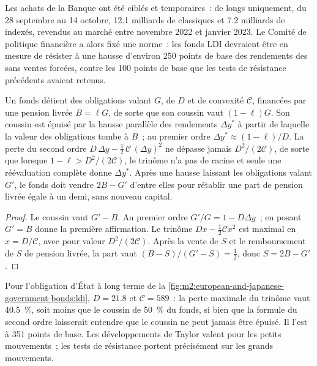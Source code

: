 Les achats de la Banque ont été ciblés et temporaires~: de longs  uniquement, du 28
septembre au 14 octobre, 12.1 milliards de  classiques et 7.2 milliards de 
indexés, revendus au marché entre novembre 2022 et janvier
2023. Le Comité de politique financière a alors fixé une norme~: les fonds LDI devraient
être en mesure de résister à une hausse d'environ 250 points de base des rendements des  sans
ventes forcées, contre les 100 points de base que les tests de résistance précédents
avaient retenus.

\begin{proposition}\label{prop:m2:european-and-japanese-government-bonds:cushion}
Un fonds détient des obligations valant $G$, de  $D$ et de convexité $\mathcal C$,
financées par une pension livrée $B = \ell G$, de sorte que son coussin vaut $(1-\ell)G$. Son coussin est
épuisé par la hausse parallèle des rendements $\Delta y^*$ à partir de laquelle la valeur des obligations tombe
à $B$~; au premier ordre $\Delta y^* \approx (1-\ell)/D$. La perte du second ordre
$D\,\Delta y - \frac12\,\mathcal C\,(\Delta y)^2$ ne dépasse jamais $D^2/(2\mathcal C)$, de sorte que
lorsque $1 - \ell > D^2/(2\mathcal C)$, le trinôme n'a pas de racine et seule une réévaluation complète
donne $\Delta y^*$. Après une hausse laissant les obligations valant $G'$, le
fonds doit vendre $2B - G'$ d'entre elles pour rétablir une part de pension livrée égale à un demi, sans
nouveau capital.
\end{proposition}
\begin{proof}
Le coussin vaut $G' - B$. Au premier ordre $G'/G = 1 - D\Delta y$~; en posant $G' = B$
donne la première affirmation. Le trinôme $D x - \frac12 \mathcal C x^2$ est maximal en
$x = D/\mathcal C$, avec pour valeur $D^2/(2\mathcal C)$. Après la vente de $S$ et le remboursement
de $S$ de pension livrée, la part vaut $(B - S)/(G' - S) = \frac12$, donc $S = 2B - G'$.
\end{proof}

Pour l'obligation d'État à long terme de la \cref{fig:m2:european-and-japanese-government-bonds:ldi},
$D = 21.8$ et $\mathcal C = 589$~: la perte maximale du trinôme vaut 40.5~\%, soit moins
que le coussin de 50~\% du fonds, si bien que la formule du second ordre laisserait entendre que le coussin
ne peut jamais être épuisé. Il l'est à 351 points de base. Les développements de Taylor
valent pour les petits mouvements~; les tests de résistance portent précisément sur les grands mouvements.

